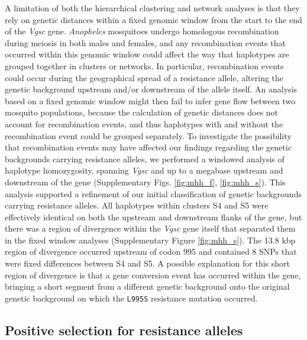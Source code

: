 \documentclass[a4paper,11pt,abstracton,hidelinks]{scrartcl}
\begin{document}
%
A limitation of both the hierarchical clustering and network analyses is that they rely on genetic distances within a fixed genomic window from the start to the end of the \textit{Vgsc} gene.
%
\textit{Anopheles} mosquitoes undergo homologous recombination during meiosis in both males and females, and any recombination events that occurred within this genomic window could affect the way that haplotypes are grouped together in clusters or networks.
%
In particular, recombination events could occur during the geographical spread of a resistance allele, altering the genetic background upstream and/or downstream of the allele itself.
%
An analysis based on a fixed genomic window might then fail to infer gene flow between two mosquito populations, because the calculation of genetic distances does not account for recombination events, and thus haplotypes with and without the recombination event could be grouped separately.
%
To investigate the possibility that recombination events may have affected our findings regarding the genetic backgrounds carrying resistance alleles, we performed a windowed analysis of haplotype homozygosity, spanning \textit{Vgsc} and up to a megabase upstream and downstream of the gene (Supplementary Figs. \ref{fig:mhh_f}, \ref{fig:mhh_s}).
%
This analysis supported a refinement of our initial classification of genetic backgrounds carrying resistance alleles.
%
All haplotypes within clusters S4 and S5 were effectively identical on both the upstream and downstream flanks of the gene, but there was a region of divergence within the \textit{Vgsc} gene itself that separated them in the fixed window analyses (Supplementary Figure \ref{fig:mhh_s}).
%
The 13.8 kbp region of divergence occurred upstream of codon 995 and contained 8 SNPs that were fixed differences between S4 and S5.
%
A possible explanation for this short region of divergence is that a gene conversion event has occurred within the gene, bringing a short segment from a different genetic background onto the original genetic background on which the \texttt{L995S} resistance mutation occurred.
%


\subsection*{Positive selection for resistance alleles}
\end{document}
